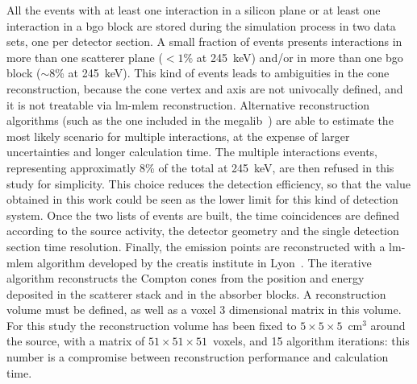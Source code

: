 All the events with at least one interaction in a silicon plane or at least one interaction in a \gls{bgo} block are stored during the simulation process in two data sets, one per detector section. A small fraction of events presents interactions in more than one scatterer plane ($<1$\% at 245~keV) and/or in more than one \gls{bgo} block ($\sim$8\% at 245~keV). This kind of events leads to ambiguities in the cone reconstruction, because the cone vertex and axis are not univocally defined, and it is not treatable via \gls{lm-mlem} reconstruction. Alternative reconstruction algorithms (such as the one included in the \gls{megalib}~\parencite{Zoglauer2006}) are able to estimate the most likely scenario for multiple interactions, at the expense of larger uncertainties and longer calculation time. The multiple interactions events, representing approximatly 8\% of the total at 245~keV, are then refused in this study for simplicity. This choice reduces the detection efficiency, so that the value obtained in this work could be seen as the lower limit for this kind of detection system. Once the two lists of events are built, the time coincidences are defined according to the source activity, the detector geometry and the single detection section time resolution. Finally, the emission points are reconstructed with a \gls{lm-mlem} algorithm developed by the \gls{creatis} institute in Lyon~\parencite{Lojacono2013}. The iterative algorithm reconstructs the Compton cones from the position and energy deposited in the scatterer stack and in the absorber blocks. A reconstruction volume must be defined, as well as a voxel 3 dimensional matrix in this volume. For this study the reconstruction volume has been fixed to $\mathrm{5\times5\times5}$~$\mathrm{cm^{3}}$ around the source, with a matrix of $\mathrm{51\times51\times51}$~voxels, and 15 algorithm iterations: this number is a compromise between reconstruction performance and calculation time.

